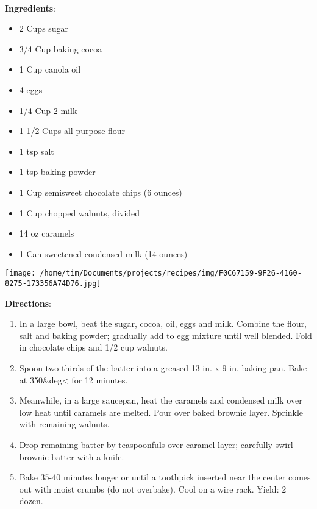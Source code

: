 \documentclass[11pt, twoside, openany]{book}
\begin{document}
 \label{caramel-brownies-recipe}\hfill\textit{}\\
\begin{minipage}[t]{0.8\linewidth}
\textbf{Ingredients}:\vspace{-3mm}
\begin{multicols}{2}
\begin{itemize}\setlength\itemsep{-1mm}
\item 2 Cups sugar
\item 3/4 Cup baking cocoa
\item 1 Cup canola oil
\item 4 eggs
\item 1/4 Cup 2 milk
\item 1 1/2 Cups all purpose flour
\item 1 tsp salt
\item 1 tsp baking powder
\item 1 Cup semisweet chocolate chips (6 ounces)
\item 1 Cup chopped walnuts, divided
\item 14 oz caramels
\item 1 Can sweetened condensed milk (14 ounces)
\end{itemize}
\end{multicols}
\end{minipage}
\begin{minipage}[t]{0.2\linewidth}
\centering \strut\vspace*{-\baselineskip}\newline
\texttt{[image: /home/tim/Documents/projects/recipes/img/F0C67159-9F26-4160-8275-173356A74D76.jpg]}\\
\end{minipage}\vspace{3mm}
\textbf{Directions}:
\vspace{-3mm}\begin{enumerate}\setlength\itemsep{-1mm}
\item In a large bowl, beat the sugar, cocoa, oil, eggs and milk. Combine the flour, salt and baking powder; gradually add to egg mixture until well blended. Fold in chocolate chips and 1/2 cup walnuts. 
\item  Spoon two-thirds of the batter into a greased 13-in. x 9-in. baking pan. Bake at 350&deg< for 12 minutes. 
\item  Meanwhile, in a large saucepan, heat the caramels and condensed milk over low heat until caramels are melted. Pour over baked brownie layer. Sprinkle with remaining walnuts. 
\item  Drop remaining batter by teaspoonfuls over caramel layer; carefully swirl brownie batter with a knife. 
\item  Bake 35-40 minutes longer or until a toothpick inserted near the center comes out with moist crumbs (do not overbake). Cool on a wire rack. Yield: 2 dozen.
\end{enumerate}
\end{document}

